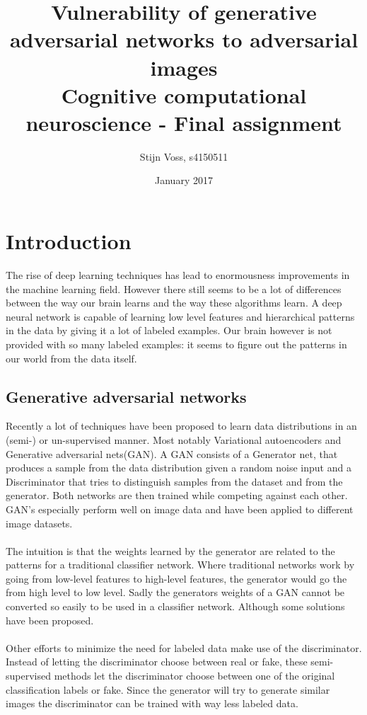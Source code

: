 \documentclass[a4paper]{article}
\title{Vulnerability of generative adversarial networks to adversarial images \\ \small{Cognitive computational neuroscience - Final assignment}}
\author{Stijn Voss, s4150511}
\date{January 2017}
\begin{document}
\maketitle
{}
\section{Introduction}
The rise of deep learning techniques has lead to enormousness improvements in the machine learning field. However there still seems to be a lot of differences between the way our brain learns and the way these algorithms learn. A deep neural network is capable of learning low level features and hierarchical patterns in the data by giving it a lot of labeled examples\cite{yosinski2015understanding}. Our brain however is not provided with so many labeled examples: it seems to figure out the patterns in our world from the data itself.
\subsection{Generative adversarial networks}
Recently a lot of techniques have been proposed to learn data distributions in an (semi-) or un-supervised manner. Most notably Variational autoencoders\cite{kingma2013auto} and Generative adversarial nets(GAN)\cite{goodfellow2014generative}. A GAN consists of a Generator net, that produces a sample from the data distribution given a random noise input and a Discriminator that tries to distinguish samples from the dataset and from the generator. Both networks are then trained while competing against each other. GAN’s especially perform well on image data and have been applied to different image datasets\cite{radford2015unsupervised,salimans2016improved}. \\ \\
The intuition is that the weights learned by the generator are related to the patterns for a traditional classifier network. Where traditional networks work by going from low-level features to high-level features, the generator would go the from high level to low level. Sadly the generators weights of a GAN cannot be converted so easily to be used in a classifier network. Although some solutions have been proposed\cite{donahue2016adversarial}.  \\ \\
Other efforts to minimize the need for labeled data make use of the discriminator. Instead of letting the discriminator choose between real or fake, these semi-supervised methods \cite{odena2016semi} let the discriminator choose between one of the original classification labels or fake. Since the generator will try to generate similar images the discriminator can be trained with way less labeled data.
\end{document}

